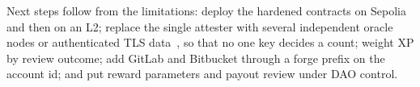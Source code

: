 \documentclass[conference]{IEEEtran}
\begin{document}
Next steps follow from the limitations: deploy the hardened contracts on Sepolia and then on an L2; replace the single attester with several independent oracle nodes or authenticated TLS data~\cite{zhang2016towncrier}, so that no one key decides a count; weight XP by review outcome; add GitLab and Bitbucket through a forge prefix on the account id; and put reward parameters and payout review under DAO control.



\end{document}
